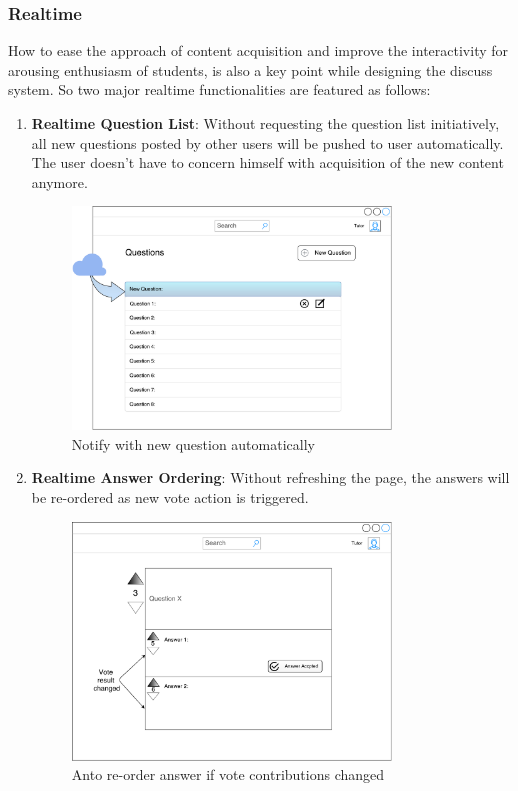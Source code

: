 \subsubsection{Realtime}
How to ease the approach of content acquisition and improve the interactivity for arousing enthusiasm of students, is also a key point while designing the discuss system. So two major realtime functionalities are featured as follows: 


\begin{enumerate}
\item
\textbf{Realtime Question List}: Without requesting the question list initiatively, all new questions posted by other users will be pushed to user automatically. The user doesn't have to concern himself with acquisition of the new content anymore.

\begin{figure}[!htbp]
  \centering
    \includegraphics[width=0.8\textwidth]{Figures/mockup/question-notify.pdf}
  \caption{Notify with new question automatically}
\end{figure}

\item
\textbf{Realtime Answer Ordering}: Without refreshing the page, the answers will be re-ordered as new vote action is triggered.

\begin{figure}[!htbp]
  \centering
    \includegraphics[width=0.8\textwidth]{Figures/mockup/votechange.pdf}
  \caption{Anto re-order answer if vote contributions changed}
\end{figure}


\end{enumerate}
